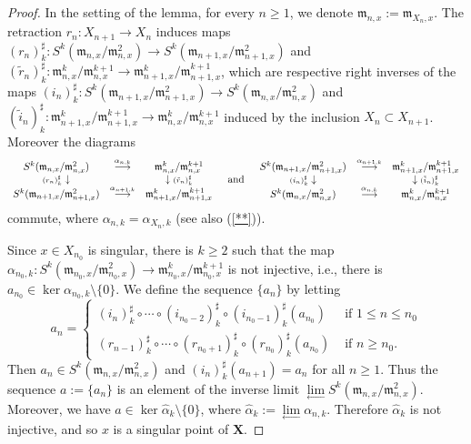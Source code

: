 \documentclass[12pt]{amsart}
\theoremstyle{definition}
\begin{document}
\begin{proof}
In the setting of the lemma, for every $n\geq 1$, we denote $\mathfrak{m}_{n,x}:=\mathfrak{m}_{X_n,x}$. The retraction $r_n:X_{n+1}\to X_n$ induces maps $(r_n)^\sharp_k:S^k(\mathfrak{m}_{n,x}/\mathfrak{m}_{n,x}^2)\to S^k(\mathfrak{m}_{n+1,x}/\mathfrak{m}_{n+1,x}^2)$ and $(\tilde{r}_n)^\sharp_k:\mathfrak{m}_{n,x}^k/\mathfrak{m}_{n,x}^{k+1}\to \mathfrak{m}_{n+1,x}^k/\mathfrak{m}_{n+1,x}^{k+1}$, which are respective right inverses of the maps $(i_n)^\sharp_k:S^k(\mathfrak{m}_{n+1,x}/\mathfrak{m}_{n+1,x}^2)\to S^k(\mathfrak{m}_{n,x}/\mathfrak{m}_{n,x}^2)$
and $(\tilde{i}_n)^\sharp_k:\mathfrak{m}_{n+1,x}^k/\mathfrak{m}_{n+1,x}^{k+1}\to \mathfrak{m}_{n,x}^k/\mathfrak{m}_{n,x}^{k+1}$ induced by the inclusion $X_n\subset X_{n+1}$. Moreover the diagrams
\[
\begin{array}{ccc}
S^k(\mathfrak{m}_{n,x}/\mathfrak{m}^2_{n,x}) & \stackrel{\alpha_{n,k}}{\longrightarrow} & \mathfrak{m}^k_{n,x}/\mathfrak{m}^{k+1}_{n,x} \\
\mbox{\scriptsize $(r_n)^\sharp_k$}\downarrow & & \downarrow\mbox{\scriptsize $(\tilde{r}_n)^\sharp_k$} \\
S^k(\mathfrak{m}_{n+1,x}/\mathfrak{m}^2_{n+1,x}) & \stackrel{\alpha_{n+1,k}}{\longrightarrow} & \mathfrak{m}^k_{n+1,x}/\mathfrak{m}^{k+1}_{n+1,x}
\end{array}
\quad\mbox{and}\quad
\begin{array}{ccc}
S^k(\mathfrak{m}_{n+1,x}/\mathfrak{m}^2_{n+1,x}) & \stackrel{\alpha_{n+1,k}}{\longrightarrow} & \mathfrak{m}^k_{n+1,x}/\mathfrak{m}^{k+1}_{n+1,x} \\
\mbox{\scriptsize $(i_n)^\sharp_k$}\downarrow & & \downarrow\mbox{\scriptsize $(\tilde{i}_n)^\sharp_k$} \\
S^k(\mathfrak{m}_{n,x}/\mathfrak{m}^2_{n,x}) & \stackrel{\alpha_{n,k}}{\longrightarrow} & \mathfrak{m}^k_{n,x}/\mathfrak{m}^{k+1}_{n,x}
\end{array}
\]
commute, where $\alpha_{n,k}=\alpha_{X_n,k}$ (see also (\ref{**})).

Since $x\in X_{n_0}$ is singular,
there is $k\geq 2$ such that the map
$\alpha_{n_0,k}:S^k(\mathfrak{m}_{n_0,x}/\mathfrak{m}^2_{n_0,x})\to\mathfrak{m}^k_{n_0,x}/\mathfrak{m}^{k+1}_{n_0,x}$
is not injective, i.e., there is $a_{n_0}\in \ker\alpha_{n_0,k}\setminus\{0\}$.
We define the sequence $\{a_n\}$ by letting
\[
a_n=\left\{\begin{array}{ll}
(i_n)^\sharp_k\circ\cdots\circ (i_{n_0-2})^\sharp_k\circ (i_{n_0-1})^\sharp_k(a_{n_0}) & \mbox{ if $1\leq n\leq n_0$} \\[1mm]
(r_{n-1})^\sharp_k\circ\cdots\circ (r_{n_0+1})^\sharp_k\circ (r_{n_0})^\sharp_k(a_{n_0}) & \mbox{ if $n\geq n_0$}.
\end{array}\right.
\]
Then $a_n\in S^k(\mathfrak{m}_{n,x}/\mathfrak{m}^2_{n,x})$ and $(i_n)^\sharp_k(a_{n+1})=a_n$ for all $n\geq 1$. Thus the sequence $a:=\{a_n\}$ is an element of the inverse limit $\lim\limits_{\leftarrow}S^k(\mathfrak{m}_{n,x}/\mathfrak{m}^2_{n,x})$. Moreover, we have $a\in\ker \hat\alpha_k\setminus\{0\}$, where $\hat\alpha_k:=\lim\limits_\leftarrow\alpha_{n,k}$. Therefore $\hat\alpha_k$ is not injective, and so $x$ is a singular point of $\mathbf{X}$.
\end{proof}
\end{document}
